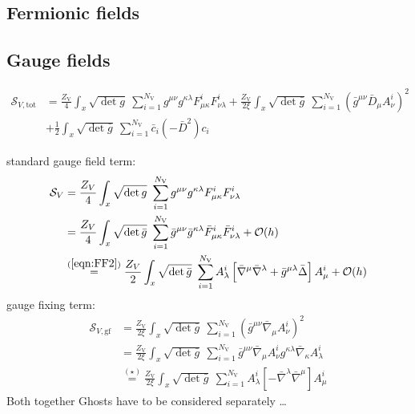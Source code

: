 \subsection{Fermionic  fields}

\subsection{Gauge fields}
\begin{align}
	\mathcal{S}_{V, \mathrm{tot}} &= \frac{Z_{\text{V}}}{4}\int_x \sqrt{\operatorname{det}g} \ \sum\limits_{i=1}^{N_{\text{V}}} g^{\mu\nu}g^{\kappa\lambda}F^{i}_{\mu\kappa}F^{i}_{\nu\lambda}  
		+ \frac{Z_{\text{V}}}{2\xi}\int_x \sqrt{\operatorname{det}\bar{g}} \ \sum\limits_{i=1}^{N_{\text{V}}} \left(\bar{g}^{\mu\nu}\bar{D}_{\mu}A_{\nu}^{i}\right)^2  \nonumber\\
		&+ \frac{1}{2}\int_x \sqrt{\operatorname{det}\bar{g}} \ \sum\limits_{i=1}^{N_{\text{V}}} \bar{c}_i(-\bar{D}^2)c_i 
\end{align}



standard gauge field term:
\begin{align}
\mathcal{S}_{V} &=  \frac{Z_V}{4}\int_x \sqrt{\operatorname{det}g} \ \sum\limits_{i=1}^{N_{\text{V}}} g^{\mu\nu}g^{\kappa\lambda}F^{i}_{\mu\kappa}F^{i}_{\nu\lambda} \nonumber \\
&=  \frac{Z_{V}}{4}\int_x \sqrt{\operatorname{det}\bar{g}} \ \sum\limits_{i=1}^{N_{\text{V}}} \bar{g}^{\mu\nu}\bar{g}^{\kappa\lambda}\bar{F}^{i}_{\mu\kappa}\bar{F}^{i}_{\nu\lambda} + \mathcal{O}(h) \\
&\overset{(\ref{eqn:FF2})}{=} \frac{Z_{V}}{2}\int_x \sqrt{\operatorname{det}\bar{g}} \ \sum\limits_{i=1}^{N_{\text{V}}} A_{\lambda}^{i}\left[ \bar{\nabla}^{\mu}\bar{\nabla}^{\lambda} + \bar{g}^{\mu\lambda}\bar{\Delta}\right]A_{\mu}^{i} + \mathcal{O}(h) \nonumber
\end{align}
gauge fixing term:
\begin{align}
	\mathcal{S}_{V, \mathrm{gf}} &= \frac{Z_{\text{V}}}{2\xi}\int_x \sqrt{\operatorname{det}\bar{g}} \ \sum\limits_{i=1}^{N_{\text{V}}} \left(\bar{g}^{\mu\nu}\bar{\nabla}_{\mu}A_{\nu}^{i}\right)^2  \nonumber\\
	&= \frac{Z_{\text{V}}}{2\xi}\int_x \sqrt{\operatorname{det}\bar{g}} \ \sum\limits_{i=1}^{N_{\text{V}}} \bar{g}^{\mu\nu}\bar{\nabla}_{\mu}A_{\nu}^{i}g^{\kappa\lambda}\bar{\nabla}_{\kappa}A_{\lambda}^{i} \\
	&\overset{(\star)}{=} \frac{Z_{\text{V}}}{2\xi}\int_x \sqrt{\operatorname{det}\bar{g}} \ \sum\limits_{i=1}^{N_{\text{V}}} A_{\lambda}^{i}\left[-\bar{\nabla}^{\lambda}\bar{\nabla}^{\mu}\right]A_{\mu}^{i} \nonumber
\end{align}
Both together 
Ghosts have to be considered separately \dots


